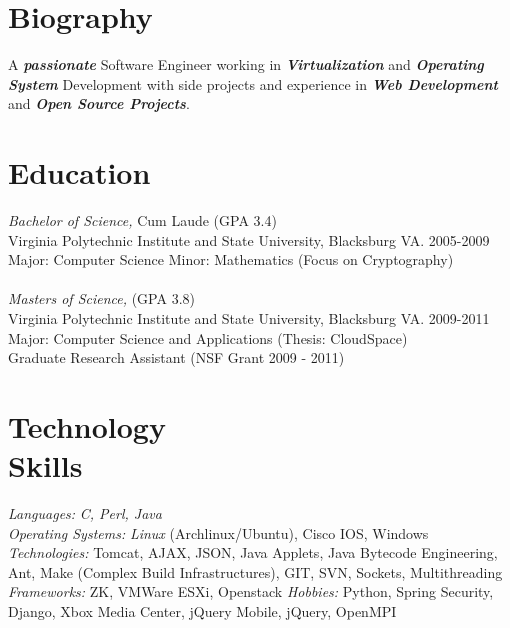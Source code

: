 \documentclass[line,margin]{res}
\begin{document}
\address{2132 Sterling Green Dr, Morrisville, NC 27560}
\address{Email: vtwoods@gmail.com --- Cell: (703)475-1337}

 
\begin{resume}
 
\section{Biography} A \textbf{\emph{passionate}} Software Engineer working in \textbf{\emph{Virtualization}} and \textbf{\emph{Operating System}} Development with side projects and experience in \textbf{\emph{Web Development}} and \textbf{\emph{Open Source Projects}}. 
 
 
\section{Education} {\sl Bachelor of Science,} Cum Laude (GPA 3.4) \\
                Virginia Polytechnic Institute and State University, Blacksburg VA. 2005-2009 \\
                Major: Computer Science Minor: Mathematics (Focus on Cryptography)\\
\\[-5pt]
                {\sl Masters of Science,} (GPA 3.8) \\
                Virginia Polytechnic Institute and State University, Blacksburg VA. 2009-2011 \\
                Major: Computer Science and Applications (Thesis:  CloudSpace) \\
                Graduate Research Assistant (NSF Grant 2009 - 2011)
 
\section{Technology \\ Skills} {\sl Languages:} \emph{C, Perl, Java} \\
                {\sl Operating Systems:} \emph{Linux} (Archlinux/Ubuntu), Cisco IOS, Windows
                {\sl Technologies:} Tomcat, AJAX, JSON, Java Applets, Java Bytecode Engineering, Ant, Make (Complex Build Infrastructures), GIT, SVN, Sockets, Multithreading
                {\sl Frameworks:} ZK, VMWare ESXi, Openstack
                {\sl Hobbies:} Python, Spring Security, Django, Xbox Media Center, jQuery Mobile, jQuery, OpenMPI
 

\end{resume}
\end{document}
